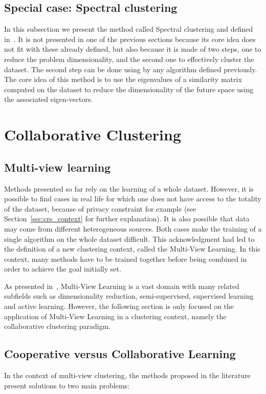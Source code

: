     \subsection{Special case: Spectral clustering}

    In this subsection we present the method called Spectral clustering and defined in~\cite{Ng01onspectral}. It is not presented in one of the previous sections because its core idea does not fit with these already defined, but also because it is made of two steps, one to reduce the problem dimensionality, and the second one to effectively cluster the dataset. The second step can be done using by any algorithm defined previously. The core idea of this method is to use the eigenvalues of a similarity matrix computed on the dataset to reduce the dimensionality of the future space using the associated eigen-vectors.


    \section{Collaborative Clustering}
\label{sec:soa_cc}

    \subsection{Multi-view learning}

    Methods presented so far rely on the learning of a whole dataset. However, it is possible to find cases in real life for which one does not have access to the totality of the dataset, because of privacy constraint for example (see Section~\ref{sec:crs_context} for further explanation). It is also possible that data may come from different heterogeneous sources. Both cases make the training of a single algorithm on the whole dataset difficult. This acknowledgment had led to the definition of a new clustering context, called the Multi-View Learning. In this context, many methods have to be trained together before being combined in order to achieve the goal initially set.
    
    As presented in~\cite{sun2013survey}, Multi-View Learning is a vast domain with many related subfields such as dimensionality reduction, semi-supervised, supervised learning and active learning. However, the following section is only focused on the application of Multi-View Learning in a clustering context, namely the collaborative clustering paradigm.
    
    \subsection{Cooperative versus Collaborative Learning}
    In the context of multi-view clustering, the methods proposed in the literature present solutions to two main problems:

